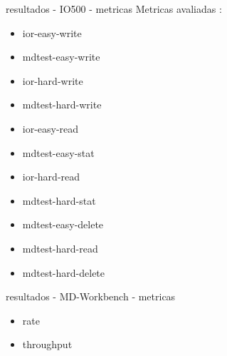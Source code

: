 \documentclass{beamer}
\begin{document}
\begin{frame}{resultados - IO500 - metricas}
	Metricas avaliadas : 
		\begin{itemize}
			\item ior-easy-write
			\item mdtest-easy-write
			\item ior-hard-write
			\item mdtest-hard-write
			\item ior-easy-read
			\item mdtest-easy-stat
			\item ior-hard-read
			\item mdtest-hard-stat
			\item mdtest-easy-delete
			\item mdtest-hard-read
			\item mdtest-hard-delete
		\end{itemize}

\end{frame}


\begin{frame}{resultados - MD-Workbench - metricas}
	\begin{itemize}
		\item rate
		\item throughput
	\end{itemize}
\end{frame}
\end{document}
